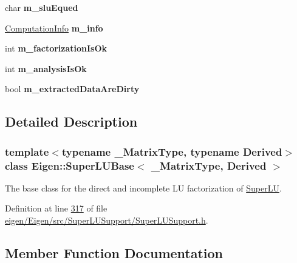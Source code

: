 \begin{DoxyCompactItemize}
\item 
\mbox{\label{class_eigen_1_1_super_l_u_base_ac9f41f87509d4599167d8d3d2f05db55}} 
char {\bfseries m\+\_\+slu\+Equed}
\item 
\mbox{\label{class_eigen_1_1_super_l_u_base_a5d5ffbddf43cbca1994bbf6a469635f3}} 
\hyperlink{group__enums_ga85fad7b87587764e5cf6b513a9e0ee5e}{Computation\+Info} {\bfseries m\+\_\+info}
\item 
\mbox{\label{class_eigen_1_1_super_l_u_base_aea5a50c7ac8ae29dc9e8af39b5a85d4c}} 
int {\bfseries m\+\_\+factorization\+Is\+Ok}
\item 
\mbox{\label{class_eigen_1_1_super_l_u_base_ab771204f054be8e628428be9bdc321fd}} 
int {\bfseries m\+\_\+analysis\+Is\+Ok}
\item 
\mbox{\label{class_eigen_1_1_super_l_u_base_a052669972e19b3225e3cb110c41876a1}} 
bool {\bfseries m\+\_\+extracted\+Data\+Are\+Dirty}
\end{DoxyCompactItemize}


\subsection{Detailed Description}
\subsubsection*{template$<$typename \+\_\+\+Matrix\+Type, typename Derived$>$\newline
class Eigen\+::\+Super\+L\+U\+Base$<$ \+\_\+\+Matrix\+Type, Derived $>$}

The base class for the direct and incomplete LU factorization of \hyperlink{class_eigen_1_1_super_l_u}{Super\+LU}. 

Definition at line \hyperlink{eigen_2_eigen_2src_2_super_l_u_support_2_super_l_u_support_8h_source_l00317}{317} of file \hyperlink{eigen_2_eigen_2src_2_super_l_u_support_2_super_l_u_support_8h_source}{eigen/\+Eigen/src/\+Super\+L\+U\+Support/\+Super\+L\+U\+Support.\+h}.



\subsection{Member Function Documentation}
\mbox{\label{class_eigen_1_1_super_l_u_base_a2d3f48425328d9b3cbdca369889007f3}} 
